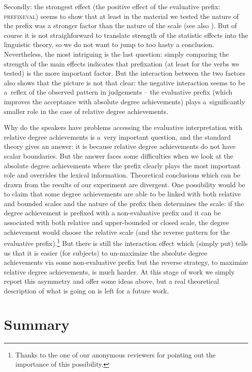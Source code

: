 \documentclass[output=paper]{langscibook}
\begin{document}
Secondly: the strongest effect (the positive effect of the evaluative prefix: \textsc{prefixeval}) seems to show that at least in the material we tested the nature of the prefix was a stronger factor than the nature of the scale (see also \cite{DocekalVlaskova2021}). But of course it is not straighforward to translate strength of the statistic effects into the linguistic theory, so we do not want to jump to too hasty a conclusion. Nevertheless, the most intriguing is the last question: simply comparing the strength of the main effects indicates that prefixation (at least for the verbs we tested) is the more important factor. But the interaction between the two factors also shows that the picture is not that clear: the negative interaction seems to be a~reflex of the observed pattern in judgements -- the evaluative prefix (which improves the acceptance with absolute degree achievements) plays a~significantly smaller role in the case of relative degree achievements. 

Why do the speakers have problems accessing the evaluative interpretation with relative degree achievements is a~very important question, and the standard theory gives an answer: it is because relative degree achievements do not have scalar boundaries. But the answer faces some difficulties when we look at the absolute degree achievements where the prefix clearly plays the most important role and overrides the lexical information. Theoretical conclusions which can be drawn from the results of our experiment are divergent. One possibility would be to claim that some degree achievements are able to be linked with both relative and bounded scales and the nature of the prefix then determines the scale: if the degree achievement is prefixed with a non-evaluative prefix and it can be associated with both relative and upper-bounded or closed scale, the degree achievement would choose the relative scale (and the reverse pattern for the evaluative prefix).\footnote{Thanks to the one of our anonymous reviewers for pointing out the importance of this possibility.} But there is still the interaction effect which (simply put) tells us that it is easier (for subjects) to un-maximize the absolute degree achievements via some non-evaluative prefix but the reverse strategy, to maximize relative degree achievements, is much harder. At this stage of work we simply report this asymmetry and offer some ideas above, but a real theoretical description of what is going on is left for a future work.

\section{Summary}\label{DA:sec:Summary}
\end{document}
